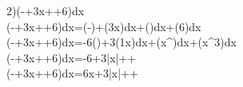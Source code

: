 2)\int\left(-+\dfrac3x++6\right)dx
\\\int\left(-+\dfrac3x++6\right)dx=\int\left(-\right)+\int\left(\dfrac3x\right)dx+\int\left(\right)dx+\int\left(6\right)dx
\\\int\left(-+\dfrac3x++6\right)dx=-6\int\left(\right)+3\int\left(\dfrac1x\right)dx+\int\left(x^{}\right)dx+\int\left(x^3\right)dx
\\\int\left(-+\dfrac3x++6\right)dx=-6\cdot{}+3\ln|x|++
\\\int\left(-+\dfrac3x++6\right)dx=\dfrac6x+3\ln|x|++